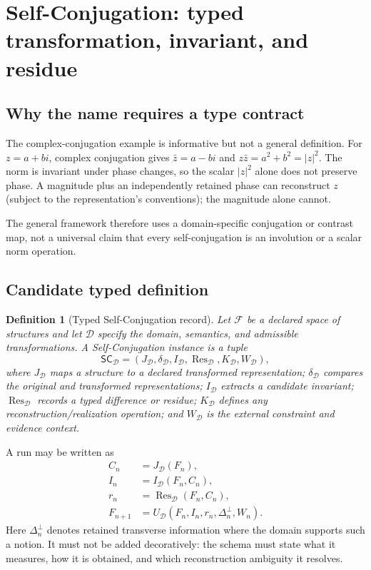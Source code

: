 \documentclass[11pt,oneside]{article}
\newtheorem{definition}{Definition}[section]
\newcommand{\SC}{\mathsf{SC}}
\newcommand{\Res}{\operatorname{Res}}
\begin{document}
\section{Self-Conjugation: typed transformation, invariant, and residue}
\subsection{Why the name requires a type contract}
The complex-conjugation example is informative but not a general definition. For $z=a+bi$, complex conjugation gives $\bar z=a-bi$ and $z\bar z=a^2+b^2=|z|^2$. The norm is invariant under phase changes, so the scalar $|z|^2$ alone does not preserve phase. A magnitude plus an independently retained phase can reconstruct $z$ (subject to the representation's conventions); the magnitude alone cannot.

The general framework therefore uses a domain-specific conjugation or contrast map, not a universal claim that every self-conjugation is an involution or a scalar norm operation.

\subsection{Candidate typed definition}
\begin{definition}[Typed Self-Conjugation record]
Let $\mathcal{F}$ be a declared space of structures and let $\mathcal{D}$ specify the domain, semantics, and admissible transformations. A Self-Conjugation instance is a tuple
\[
\SC_{\mathcal D}=(J_{\mathcal D},\delta_{\mathcal D},I_{\mathcal D},\Res_{\mathcal D},K_{\mathcal D},W_{\mathcal D}),
\]
where $J_{\mathcal D}$ maps a structure to a declared transformed representation; $\delta_{\mathcal D}$ compares the original and transformed representations; $I_{\mathcal D}$ extracts a candidate invariant; $\Res_{\mathcal D}$ records a typed difference or residue; $K_{\mathcal D}$ defines any reconstruction/realization operation; and $W_{\mathcal D}$ is the external constraint and evidence context.
\end{definition}

A run may be written as
\begin{align}
C_n &= J_{\mathcal D}(F_n),\\
I_n &= I_{\mathcal D}(F_n,C_n),\\
r_n &= \Res_{\mathcal D}(F_n,C_n),\\
F_{n+1} &= U_{\mathcal D}(F_n,I_n,r_n,\Delta_n^{\perp},W_n).
\end{align}
Here $\Delta_n^{\perp}$ denotes retained transverse information where the domain supports such a notion. It must not be added decoratively: the schema must state what it measures, how it is obtained, and which reconstruction ambiguity it resolves.
\end{document}
